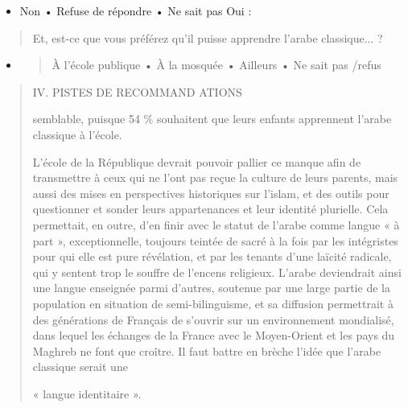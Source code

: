 \begin{itemize}
\item
  Non • Refuse de répondre • Ne sait pas Oui :
\end{itemize}

\begin{quote}
Et, est-ce que vous préférez qu'il puisse apprendre l'arabe classique...
?
\end{quote}

\begin{itemize}
\item
  \begin{quote}
  À l'école publique • À la mosquée • Ailleurs • Ne sait pas /refus
  \end{quote}
\end{itemize}

\begin{quote}
IV. PISTES DE RECOMMAND ATIONS

semblable, puisque 54 \% souhaitent que leurs enfants apprennent l'arabe
classique à l'école.

L'école de la République devrait pouvoir pallier ce manque afin de
transmettre à ceux qui ne l'ont pas reçue la culture de leurs parents,
mais aussi des mises en perspectives historiques sur l'islam, et des
outils pour questionner et sonder leurs appartenances et leur identité
plurielle. Cela permettait, en outre, d'en finir avec le statut de
l'arabe comme langue « à part », exceptionnelle, toujours teintée de
sacré à la fois par les intégristes pour qui elle est pure révélation,
et par les tenants d'une laïcité radicale, qui y sentent trop le souffre
de l'encens religieux. L'arabe deviendrait ainsi une langue enseignée
parmi d'autres, soutenue par une large partie de la population en
situation de semi-bilinguisme, et sa diffusion permettrait à des
générations de Français de s'ouvrir sur un environnement mondialisé,
dans lequel les échanges de la France avec le Moyen-Orient et les pays
du Maghreb ne font que croître. Il faut battre en brèche l'idée que
l'arabe classique serait une

« langue identitaire ».


\end{quote}
